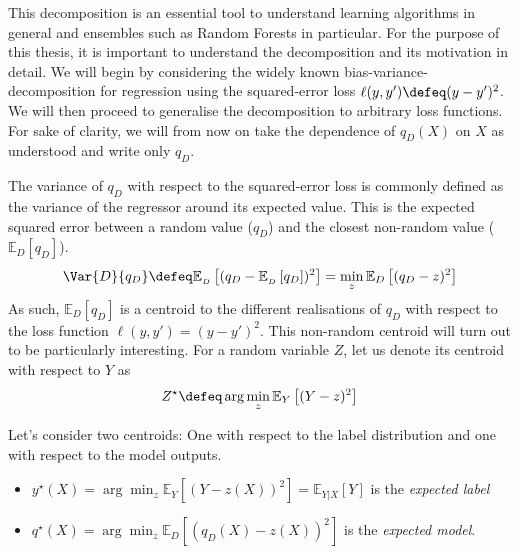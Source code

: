 \documentclass[
    a4paper, %
	fontsize=10pt, %
	twoside=false, %
]{kaobook}
\begin{document}
This decomposition is an essential tool to understand learning algorithms in general and ensembles such as Random Forests in particular. For the purpose of this thesis, it is important to understand the decomposition and its motivation in detail. 
We will begin by considering the widely known bias-variance-decomposition for regression using the squared-error loss $\ell(y, y') \defeq (y- y')^2$. We will then proceed to generalise the decomposition to arbitrary loss functions.
For sake of clarity, we will from now on take the dependence of $q_{D}(X)$ on $X$ as understood and write only $q_{D}$.

The variance of $q_{D}$ with respect to the squared-error loss is commonly defined as the variance of the regressor around its expected value. This is the expected squared error between a random value ($q_{D}$) and the closest non-random value ($\mathbb{E}_{D}\left[q_{D}\right]$). 
$$
\Var{D}{q_{D}} \defeq \mathbb{E}_{_{D}}\left[ (q_{D}- \mathbb{E}_{_{D}}\left[ q_{D} \right] )^2 \right]  = \min_{z} \mathbb{E}_{D}\left[ (q_{D} - z)^2 \right] 
$$
As such, $\mathbb{E}_{D}\left[ q_{D} \right]$ is a centroid to the different realisations of $q_{D}$ with respect to the loss function $\ell(y,y') = (y-y')^2$.
This non-random centroid will turn out to be particularly interesting. For a random variable $Z$, let us denote its centroid with respect to $Y$ as
$$
Z^\star \defeq \arg \min_{z} \mathbb{E}_Y\left[ (Y - z)^2 \right]
$$

Let's consider two centroids: One with respect to the label distribution and one with respect to the model outputs.
\begin{itemize}
\item $y^\star(X) = \arg\min_{z} \mathbb{E}_{Y}\left[ (Y - z(X))^2 \right] = \mathbb{E}_{Y|X}\left[ Y \right]$ is the \textit{expected label} %
\item $q^\star(X) = \arg \min_{z} \mathbb{E}_{D}\left[ (q_{D}(X) - z(X))^2 \right]$ is the \textit{expected model}.
\end{itemize}
\end{document}
